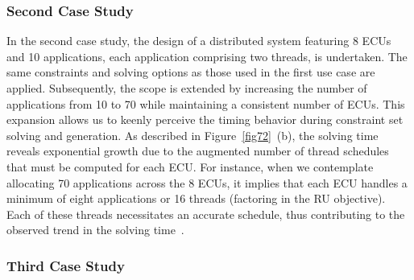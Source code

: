     \subsubsection{Second Case Study}


    In the second case study, the design of a distributed system featuring 8 ECUs and 10 applications, each application comprising two threads, is undertaken. The same constraints and solving options as those used in the first use case are applied. Subsequently, the scope is extended by increasing the number of applications from 10 to 70 while maintaining a consistent number of ECUs. This expansion allows us to keenly perceive the timing behavior during constraint set solving and generation.
    As described in Figure~\ref{fig72}~(b), the solving time reveals exponential growth due to the augmented number of thread schedules that must be computed for each ECU. For instance, when we contemplate allocating 70 applications across the 8 ECUs, it implies that each ECU handles a minimum of eight applications or 16 threads (factoring in the RU objective). Each of these threads necessitates an accurate schedule, thus contributing to the observed trend in the solving time~\cite{askaripoor2023designer}.
    
    \subsubsection{Third Case Study}

         
